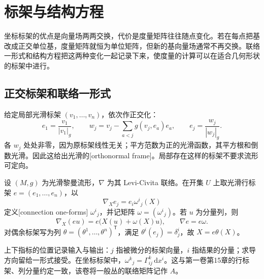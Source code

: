 
% 
% 

\section{标架与结构方程}
\label{g3:sec:0103}

坐标标架的优点是向量场两两交换，代价是度量矩阵往往随点变化。若在每点把基改成正交单位基，度量矩阵就恒为单位矩阵，但新的基向量场通常不再交换。联络一形式和结构方程把这两种变化一起记录下来，使度量的计算可以在适合几何形状的标架中进行。

\subsection{正交标架和联络一形式}
\label{g3:subsec:0103:01}

给定局部光滑标架 \((v_1,\ldots,v_n)\)，依次作正交化：
\[
	e_1=\frac{v_1}{|v_1|_g},\qquad
	w_j=v_j-\sum_{a<j}g(v_j,e_a)e_a,\qquad
	e_j=\frac{w_j}{|w_j|_g}.
\]
各 \(w_j\) 处处非零，因为原标架线性无关；平方范数为正的光滑函数，其平方根和倒数光滑。因此这给出光滑的[orthonormal frame]。局部存在这样的标架不要求流形可定向。

\begin{definition}\label{g3:def:connection-one-forms}
	设 \((M,g)\) 为光滑黎曼流形，\(\nabla\) 为其 Levi-Civita 联络。在开集 \(U\) 上取光滑行标架 \(e=(e_1,\ldots,e_n)\)，以
	\[
		\nabla_Xe_j=e_i\omega^i{}_j(X)
	\]
	定义[connection one-forms] \(\omega^i{}_j\)，并记矩阵 \(\omega=(\omega^i{}_j)\)。若 \(u\) 为分量列，则
	\begin{equation}\label{g3:eq:frame-connection}
		\nabla_X(eu)=e\bigl(X(u)+\omega(X)u\bigr),\qquad
		\nabla e=e\omega.
	\end{equation}
	对偶余标架写为列 \(\theta=(\theta^1,\ldots,\theta^n)^{\mathsf T}\)，满足 \(\theta^i(e_j)=\delta^i_j\)，故 \(X=e\theta(X)\)。
\end{definition}

上下指标的位置记录输入与输出：\(j\) 指被微分的标架向量，\(i\) 指结果的分量；求导方向留给一形式接受。在坐标标架中，\(\omega^k{}_j=\Gamma^k_{ij}\,\mathrm{d}x^i\)。这与第一卷第15章的行标架、列分量约定一致，该卷将一般丛的联络矩阵记作 \(A\)。

